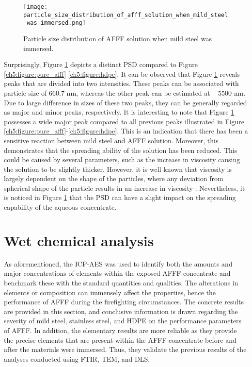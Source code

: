 \begin{figure}[H]
    \centering
    \texttt{[image: particle\_size\_distribution\_of\_afff\_solution\_when\_mild\_steel\_was\_immersed.png]}
    \caption{Particle size distribution of AFFF solution when mild steel was immersed.}
    \label{ch5:figure:mild_steel}
\end{figure}

Surprisingly, Figure \ref{ch5:figure:mild_steel} depicts a distinct PSD compared to Figure \ref{ch5:figure:pure_afff}-\ref{ch5:figure:hdpe}. It can be observed that Figure \ref{ch5:figure:mild_steel} reveals peaks that are divided into two intensities. These peaks can be associated with particle size of 660.7 nm, whereas the other peak can be estimated at ~ 5500 nm.  Due to large difference in sizes of these two peaks, they can be generally regarded as major and minor peaks, respectively.  It is interesting to note that Figure \ref{ch5:figure:mild_steel} possesses a wide major peak compared to all previous peaks illustrated in Figure \ref{ch5:figure:pure_afff}-\ref{ch5:figure:hdpe}. This is an indication that there has been a sensitive reaction between mild steel and AFFF solution. Moreover, this demonstrates that the spreading ability of the solution has been reduced. This could be caused by several parameters, such as the increase in viscosity causing the solution to be slightly thicker. However, it is well known that viscosity is largely dependent on the shape of the particles, where any deviation from spherical shape of the particle results in an increase in viscosity \cite{klein2011transmission}. Nevertheless, it is noticed in Figure \ref{ch5:figure:mild_steel} that the PSD can have a slight impact on the spreading capability of the aqueous concentrate.

\section{Wet chemical analysis}
As aforementioned, the ICP-AES was used to identify both the amounts and major concentrations of elements within the exposed AFFF concentrate and benchmark these with the standard quantities and qualities. The alterations in elements or composition can immensely affect the properties, hence the performance of AFFF during the firefighting circumstances. The concrete results are provided in this section, and conclusive information is drawn regarding the severity of mild steel, stainless steel, and HDPE on the performance parameters of AFFF. In addition, the elementary results are more reliable as they provide the precise elements that are present within the AFFF concentrate before and after the materials were immersed. Thus, they validate the previous results of the analyses conducted using FTIR, TEM, and DLS.

